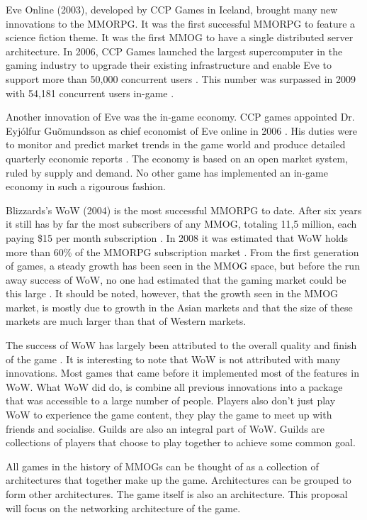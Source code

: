 \documentclass[journal,oneside,a4paper,onecolumn]{IEEEtran}
\begin{document}
Eve Online (2003), developed by CCP Games in Iceland, brought many new innovations to the \ac{MMORPG}. It was the first successful MMORPG to feature a science fiction theme. It was the first MMOG to have a single distributed server architecture. In 2006, CCP Games launched the largest supercomputer in the gaming industry to upgrade their existing infrastructure and enable Eve to support more than 50,000 concurrent users \cite{eve_launces_supcom}. This number was surpassed in 2009 with 54,181 concurrent users in-game \cite{eve_pcu}.

Another innovation of Eve was the in-game economy. CCP games appointed Dr. Eyj\'{o}lfur Gu\~{o}mundsson as chief economist of Eve online in 2006 \cite{eve_economist}. His duties were to monitor and predict market trends in the game world and produce detailed quarterly economic reports \cite{eve_econ_rep}.  The economy is based on an open market system, ruled by supply and demand. No other game has implemented an in-game economy in such a rigourous fashion.

Blizzards's \ac{WoW} (2004) is the most successful MMORPG to date. After six years it still has by far the most subscribers of any MMOG, totaling 11,5 million, each paying \$15 per month subscription \cite{wow_subscibers}. In 2008 it was estimated that WoW holds more than 60\% of the MMORPG subscription market \cite{mmog_sub_market}. From the first generation of games, a steady growth has been seen in the MMOG space, but before the run away success of WoW, no one had estimated that the gaming market could be this large \cite{mmog_growth_analysis}. It should be noted, however, that the growth seen in the \ac{MMOG} market, is mostly due to growth in the Asian markets and that the size of these markets are much larger than that of Western markets.

The success of \ac{WoW} has largely been attributed to the overall quality and finish of the game \cite{wow_gameplay}. It is interesting to note that WoW is not attributed with many innovations. Most games that came before it implemented most of the features in WoW. What WoW did do, is combine all previous innovations into a package that was accessible to a large number of people.  Players also don't just play WoW to experience the game content, they play the game to meet up with friends and socialise. Guilds are also an integral part of WoW. Guilds are collections of players that choose to play together to achieve some common goal.

All games in the history of \acp{MMOG} can be thought of as a collection of architectures that together make up the game. Architectures can be grouped to form other architectures. The game itself is also an architecture. This proposal will focus on the networking architecture of the game.
\end{document}
